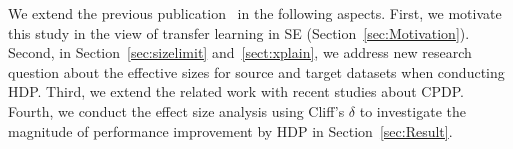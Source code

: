 We extend the previous publication~\cite{Nam15HDP} in the following aspects. First, we motivate this study in the view of transfer learning in SE (Section~\ref{sec:Motivation}). Second, in Section~\ref{sec:sizelimit} and~\ref{sect:xplain}, we address new research question about the effective sizes for source and target datasets when conducting HDP. Third, we extend the related work with recent studies about CPDP. Fourth, we conduct the effect size analysis using Cliff's $\delta$ to investigate the magnitude of performance improvement by HDP in Section~\ref{sec:Result}.

